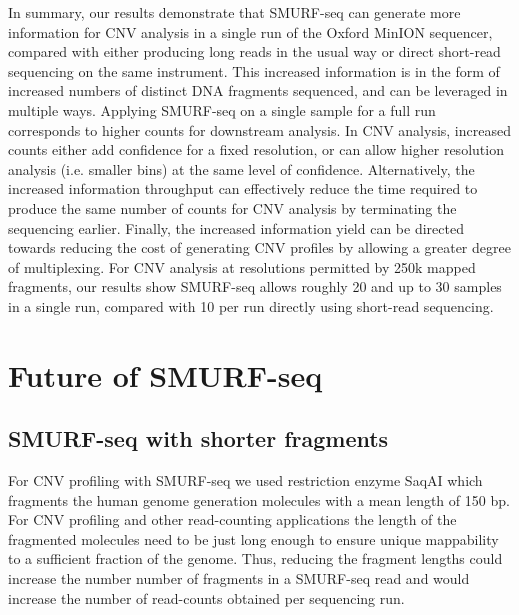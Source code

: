 In summary, our results demonstrate that SMURF-seq can generate more
information for CNV analysis in a single run of the Oxford MinION
sequencer, compared with either producing long reads in the usual way or
direct short-read sequencing on the same instrument.  This increased
information is in the form of increased numbers of distinct DNA
fragments sequenced, and can be leveraged in multiple ways. Applying
SMURF-seq on a single sample for a full run corresponds to higher counts
for downstream analysis. In CNV analysis, increased counts either add
confidence for a fixed resolution, or can allow higher resolution
analysis (i.e. smaller bins) at the same level of confidence.
Alternatively, the increased information throughput can effectively
reduce the time required to produce the same number of counts for CNV
analysis by terminating the sequencing earlier. Finally, the increased
information yield can be directed towards reducing the cost of
generating CNV profiles by allowing a greater degree of multiplexing.
For CNV analysis at resolutions permitted by 250k mapped fragments, our
results show SMURF-seq allows roughly 20 and up to 30 samples in a
single run, compared with 10 per run directly using short-read
sequencing.

\section{Future of SMURF-seq}
\label{future_smurf}

\subsection*{SMURF-seq with shorter fragments}
For CNV profiling with SMURF-seq we used restriction enzyme SaqAI which
fragments the human genome generation molecules with a mean length of
150 bp. For CNV profiling and other read-counting applications the
length of the fragmented molecules need to be just long enough to ensure
unique mappability to a sufficient fraction of the genome. Thus,
reducing the fragment lengths could increase the number number of
fragments in a SMURF-seq read and would increase the number of
read-counts obtained per sequencing run.

